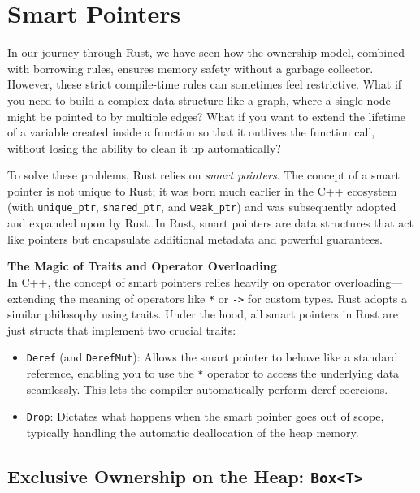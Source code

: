 \chapter{Smart Pointers}

In our journey through Rust, we have seen how the ownership model, combined with borrowing rules, ensures memory safety without a garbage collector. However, these strict compile-time rules can sometimes feel restrictive. What if you need to build a complex data structure like a graph, where a single node might be pointed to by multiple edges? What if you want to extend the lifetime of a variable created inside a function so that it outlives the function call, without losing the ability to clean it up automatically?

To solve these problems, Rust relies on \textit{smart pointers}. The concept of a smart pointer is not unique to Rust; it was born much earlier in the C++ ecosystem (with \texttt{unique\_ptr}, \texttt{shared\_ptr}, and \texttt{weak\_ptr}) and was subsequently adopted and expanded upon by Rust. In Rust, smart pointers are data structures that act like pointers but encapsulate additional metadata and powerful guarantees. 

\begin{insightbox}
\textbf{The Magic of Traits and Operator Overloading} \\
In C++, the concept of smart pointers relies heavily on operator overloading---extending the meaning of operators like \texttt{*} or \texttt{->} for custom types. Rust adopts a similar philosophy using traits. Under the hood, all smart pointers in Rust are just structs that implement two crucial traits:
\begin{itemize}
    \item \texttt{Deref} (and \texttt{DerefMut}): Allows the smart pointer to behave like a standard reference, enabling you to use the \texttt{*} operator to access the underlying data seamlessly. This lets the compiler automatically perform deref coercions.
    \item \texttt{Drop}: Dictates what happens when the smart pointer goes out of scope, typically handling the automatic deallocation of the heap memory.
\end{itemize}
\end{insightbox}

\section{Exclusive Ownership on the Heap: \texttt{Box<T>}}

